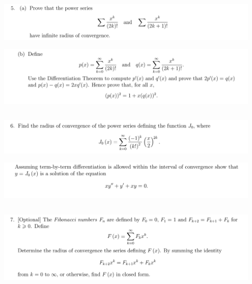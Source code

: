 \documentclass[12pt]{article}
\begin{document}
\newpage
\subsection{}
\begin{mdframed}
\includegraphics[width=400pt]{img/analysis--oxford-M2-I-7-5.png}
\end{mdframed}

\begin{mdframed}
\includegraphics[width=400pt]{img/analysis--oxford-M2-I-7-5-b.png}
\end{mdframed}

\newpage
\subsection{}
\begin{mdframed}
\includegraphics[width=400pt]{img/analysis--oxford-M2-I-7-6-a.png}
\end{mdframed}

\begin{mdframed}
\includegraphics[width=400pt]{img/analysis--oxford-M2-I-7-6-b.png}
\end{mdframed}

\newpage
\subsection{}
\begin{mdframed}
\includegraphics[width=400pt]{img/analysis--oxford-M2-I-7-7.png}
\end{mdframed}
\end{document}
